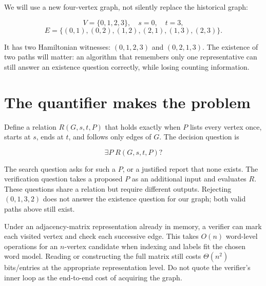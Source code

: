 We will use a new four-vertex graph, not silently replace the historical
graph:

\begin{equation}
V=\{0,1,2,3\},\quad s=0,\quad t=3,
\end{equation} \begin{equation}
E=\{(0,1),(0,2),(1,2),(2,1),(1,3),(2,3)\}.
\end{equation}

It has two Hamiltonian witnesses: \((0,1,2,3)\) and \((0,2,1,3)\). The
existence of two paths will matter: an algorithm that remembers only one
representative can still answer an existence question correctly, while
losing counting information.

\section{The quantifier makes the
problem}\label{the-quantifier-makes-the-problem}

Define a relation \(R(G,s,t,P)\) that holds exactly when \(P\) lists
every vertex once, starts at \(s\), ends at \(t\), and follows only
edges of \(G\). The decision question is

\begin{equation}
\exists P\;R(G,s,t,P)?
\end{equation}

The search question asks for such a \(P\), or a justified report that
none exists. The verification question takes a proposed \(P\) as an
additional input and evaluates \(R\). These questions share a relation
but require different outputs. Rejecting \((0,1,3,2)\) does not answer
the existence question for our graph; both valid paths above still
exist.


Under an adjacency-matrix representation already in memory, a verifier
can mark each visited vertex and check each successive edge. This takes
\(O(n)\) word-level operations for an \(n\)-vertex candidate when
indexing and labels fit the chosen word model. Reading or constructing
the full matrix still costs \(\Theta(n^2)\) bits/entries at the
appropriate representation level. Do not quote the verifier's inner loop
as the end-to-end cost of acquiring the graph.

